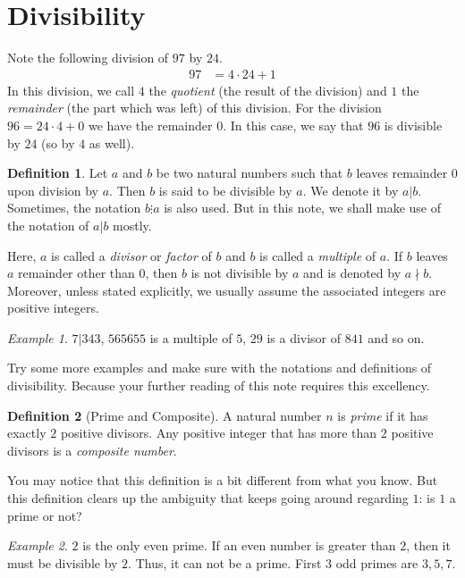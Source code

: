 \documentclass[a4paper, leqno]{article}
\theoremstyle{definition}
\newtheorem{definition}{Definition}
\theoremstyle{remark}
\newtheorem*{example}{Example}
\begin{document}
	\section{Divisibility}
		Note the following division of $97$ by $24$.
			\begin{align*}
				97 & = 4\cdot24+1
			\end{align*}
		In this division, we call $4$ the \textit{quotient} (the result of the division) and $1$ the \textit{remainder} (the part which was left) of this division. For the division $96 = 24 · 4 + 0$ we have the remainder $0$. In this case, we say that $96$ is divisible by $24$ (so by $4$ as well).
			\begin{definition}
				Let $a$ and $b$ be two natural numbers such that $b$ leaves remainder $0$ upon division by $a$. Then $b$ is said to be divisible by $a$. We denote it by $a|b$. Sometimes, the notation $b\vdots a$ is also used. But in this note, we shall make use of the notation of $a|b$ mostly.
				
				Here, $a$ is called a \textit{divisor} or \textit{factor} of $b$ and $b$ is called a \textit{multiple} of $a$. If $b$ leaves $a$ remainder other than $0$, then $b$ is not divisible by $a$ and is denoted by $a\nmid b$. Moreover, unless stated explicitly, we usually assume the associated integers are positive integers.
			\end{definition}
			
			\begin{example}
				$7|343$, $565655$ is a multiple of $5$, $29$ is a divisor of $841$ and so on.
			\end{example}
		Try some more examples and make sure with the notations and definitions of divisibility. Because your further reading of this note requires this excellency.
			\begin{definition}[Prime and Composite]
				A natural number $n$ is \textit{prime} if it has exactly $2$ positive divisors. Any positive integer that has more than $2$ positive divisors is a \textit{composite number}.
			\end{definition}
		You may notice that this definition is a bit different from what you know. But this definition clears up the ambiguity that keeps going around regarding $1$: is $1$ a prime or not?
			\begin{example}
				$2$ is the only even prime. If an even number is greater than $2$, then it must be divisible by $2$. Thus, it can not be a prime. First $3$ odd primes are $3, 5, 7$.
			\end{example}
\end{document}

